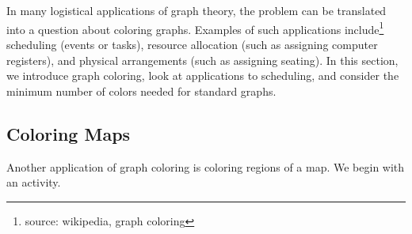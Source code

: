 \section{\seccolorgraphs}
\label{sec_color_graphs}

In many logistical applications of graph theory, the problem can be translated into a question about coloring graphs.  Examples of such applications include\footnote{source: wikipedia, graph coloring} scheduling (events or tasks), resource allocation  (such as assigning computer registers), and physical arrangements (such as assigning seating). In this section, we introduce graph coloring, look at applications to scheduling, and consider the minimum number of colors needed for standard graphs.

\newcommand{\subcolormaps}{Coloring Maps}
\subsection{\subcolormaps}
\label{sub_color_maps}

Another application of graph coloring is coloring regions of a map.  We begin with an activity.

